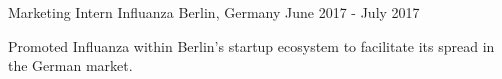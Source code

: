 \begin{cventries}
  \cventry
    {Marketing Intern}
    {Influanza}
    {Berlin, Germany}
    {June 2017 - July 2017}
    {
      \begin{cvitems}
        \item {Promoted Influanza within Berlin's startup ecosystem to facilitate its spread in the German market.}
      \end{cvitems}
    }


\end{cventries}
